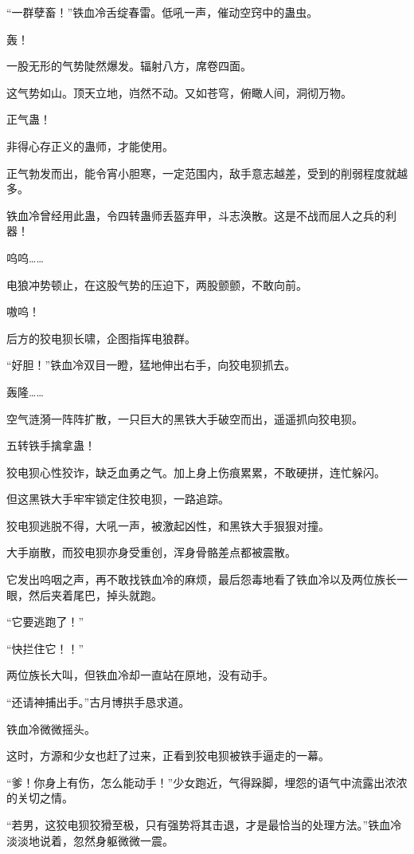 \begin{this_body}
“一群孽畜！”铁血冷舌绽春雷。低吼一声，催动空窍中的蛊虫。

轰！

一股无形的气势陡然爆发。辐射八方，席卷四面。

这气势如山。顶天立地，岿然不动。又如苍穹，俯瞰人间，洞彻万物。

正气蛊！

非得心存正义的蛊师，才能使用。

正气勃发而出，能令宵小胆寒，一定范围内，敌手意志越差，受到的削弱程度就越多。

铁血冷曾经用此蛊，令四转蛊师丢盔弃甲，斗志涣散。这是不战而屈人之兵的利器！

呜呜……

电狼冲势顿止，在这股气势的压迫下，两股颤颤，不敢向前。

嗷呜！

后方的狡电狈长啸，企图指挥电狼群。

“好胆！”铁血冷双目一瞪，猛地伸出右手，向狡电狈抓去。

轰隆……

空气涟漪一阵阵扩散，一只巨大的黑铁大手破空而出，遥遥抓向狡电狈。

五转铁手擒拿蛊！

狡电狈心性狡诈，缺乏血勇之气。加上身上伤痕累累，不敢硬拼，连忙躲闪。

但这黑铁大手牢牢锁定住狡电狈，一路追踪。

狡电狈逃脱不得，大吼一声，被激起凶性，和黑铁大手狠狠对撞。

大手崩散，而狡电狈亦身受重创，浑身骨骼差点都被震散。

它发出呜咽之声，再不敢找铁血冷的麻烦，最后怨毒地看了铁血冷以及两位族长一眼，然后夹着尾巴，掉头就跑。

“它要逃跑了！”

“快拦住它！！”

两位族长大叫，但铁血冷却一直站在原地，没有动手。

“还请神捕出手。”古月博拱手恳求道。

铁血冷微微摇头。

这时，方源和少女也赶了过来，正看到狡电狈被铁手逼走的一幕。

“爹！你身上有伤，怎么能动手！”少女跑近，气得跺脚，埋怨的语气中流露出浓浓的关切之情。

“若男，这狡电狈狡猾至极，只有强势将其击退，才是最恰当的处理方法。”铁血冷淡淡地说着，忽然身躯微微一震。


\end{this_body}
